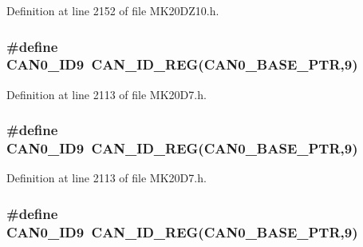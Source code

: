 Definition at line 2152 of file M\+K20\+D\+Z10.\+h.

\subsubsection[{\texorpdfstring{C\+A\+N0\+\_\+\+I\+D9}{CAN0_ID9}}]{\setlength{\rightskip}{0pt plus 5cm}\#define C\+A\+N0\+\_\+\+I\+D9~{\bf C\+A\+N\+\_\+\+I\+D\+\_\+\+R\+EG}({\bf C\+A\+N0\+\_\+\+B\+A\+S\+E\+\_\+\+P\+TR},9)}\hypertarget{group___c_a_n___register___accessor___macros_gacc7a3c948b374ad27f2d2364da74e4fb}{}\label{group___c_a_n___register___accessor___macros_gacc7a3c948b374ad27f2d2364da74e4fb}


Definition at line 2113 of file M\+K20\+D7.\+h.

\subsubsection[{\texorpdfstring{C\+A\+N0\+\_\+\+I\+D9}{CAN0_ID9}}]{\setlength{\rightskip}{0pt plus 5cm}\#define C\+A\+N0\+\_\+\+I\+D9~{\bf C\+A\+N\+\_\+\+I\+D\+\_\+\+R\+EG}({\bf C\+A\+N0\+\_\+\+B\+A\+S\+E\+\_\+\+P\+TR},9)}\hypertarget{group___c_a_n___register___accessor___macros_gacc7a3c948b374ad27f2d2364da74e4fb}{}\label{group___c_a_n___register___accessor___macros_gacc7a3c948b374ad27f2d2364da74e4fb}


Definition at line 2113 of file M\+K20\+D7.\+h.

\subsubsection[{\texorpdfstring{C\+A\+N0\+\_\+\+I\+D9}{CAN0_ID9}}]{\setlength{\rightskip}{0pt plus 5cm}\#define C\+A\+N0\+\_\+\+I\+D9~{\bf C\+A\+N\+\_\+\+I\+D\+\_\+\+R\+EG}({\bf C\+A\+N0\+\_\+\+B\+A\+S\+E\+\_\+\+P\+TR},9)}\hypertarget{group___c_a_n___register___accessor___macros_gacc7a3c948b374ad27f2d2364da74e4fb}{}\label{group___c_a_n___register___accessor___macros_gacc7a3c948b374ad27f2d2364da74e4fb}



